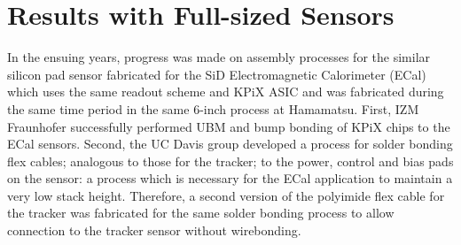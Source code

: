\documentclass[prc,12pt,nofootinbib,letterpaper]{revtex4}
\begin{document}
\section{Results with Full-sized Sensors}

In the ensuing years, progress was made on assembly processes for the similar silicon pad sensor fabricated for the SiD Electromagnetic Calorimeter (ECal) which uses the same readout scheme and KPiX ASIC and was fabricated during the same time period in the same 6-inch process at Hamamatsu.  First, IZM Fraunhofer successfully performed UBM and bump bonding of KPiX chips to the ECal sensors.  Second, the UC Davis group developed a process for solder bonding flex cables; analogous to those for the tracker; to the power, control and bias pads on the sensor: a process which is necessary for the ECal application to maintain a very low stack height.  Therefore, a second version of the polyimide flex cable for the tracker was fabricated for the same solder bonding process to allow connection to the tracker sensor without wirebonding.  
\end{document}
